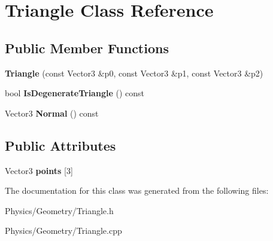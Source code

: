 \hypertarget{classTriangle}{}\section{Triangle Class Reference}
\label{classTriangle}
\subsection*{Public Member Functions}
\begin{DoxyCompactItemize}
\item 
\mbox{\label{classTriangle_a92decf8cb6085cea9ff3db39637d8539}} 
{\bfseries Triangle} (const Vector3 \&p0, const Vector3 \&p1, const Vector3 \&p2)
\item 
\mbox{\label{classTriangle_a475f07ea83d763614570c820dd10230b}} 
bool {\bfseries Is\+Degenerate\+Triangle} () const
\item 
\mbox{\label{classTriangle_afa65f5d26672ed568b4266a66a372c3a}} 
Vector3 {\bfseries Normal} () const
\end{DoxyCompactItemize}
\subsection*{Public Attributes}
\begin{DoxyCompactItemize}
\item 
\mbox{\label{classTriangle_a7b7eb4c8f1bff4276ccc8a297e830767}} 
Vector3 {\bfseries points} \mbox{[}3\mbox{]}
\end{DoxyCompactItemize}


The documentation for this class was generated from the following files\+:\begin{DoxyCompactItemize}
\item 
Physics/\+Geometry/Triangle.\+h\item 
Physics/\+Geometry/Triangle.\+cpp\end{DoxyCompactItemize}
